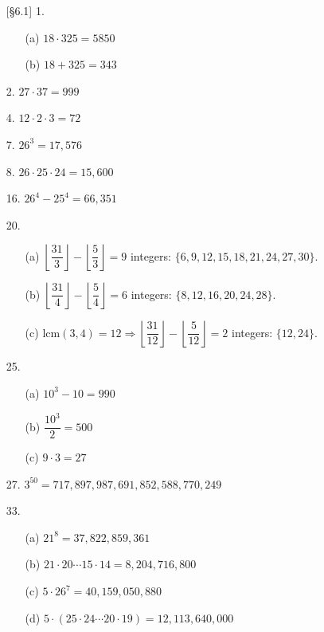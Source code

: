 \documentclass{article}
\begin{document}
\begin{enumerate}
    \item[{[\S 6.1]} 1.]
        \begin{itemize}
            \item[(a)] $18 \cdot 325 = 5850$
            \item[(b)] $18 + 325 = 343$
        \end{itemize}
    \item[2.] $27 \cdot 37 = 999$
    \item[4.] $12 \cdot 2 \cdot 3 = 72$
    \item[7.] $26^3 = 17,576$
    \item[8.] $26 \cdot 25 \cdot 24 = 15,600$
    \item[16.] $26^4 - 25^4 = 66,351$
    \item[20.]
        \begin{itemize}
            \item[(a)] $\left\lfloor\dfrac{31}{3}\right\rfloor - \left\lfloor\dfrac{5}{3}\right\rfloor = 9$ integers: $\{ 6, 9, 12, 15, 18, 21, 24, 27, 30 \}$.
            \item[(b)] $\left\lfloor\dfrac{31}{4}\right\rfloor - \left\lfloor\dfrac{5}{4}\right\rfloor = 6$ integers: $\{ 8, 12, 16, 20, 24, 28 \}$.
            \item[(c)] $\mathrm{lcm}(3,4) = 12 \Longrightarrow \left\lfloor\dfrac{31}{12}\right\rfloor - \left\lfloor\dfrac{5}{12}\right\rfloor = 2$ integers: $\{ 12, 24 \}$.
        \end{itemize}
    \item[25.]
        \begin{itemize}
            \item[(a)] $10^3 - 10 = 990$
            \item[(b)] $\dfrac{10^3}{2} = 500$
            \item[(c)] $9 \cdot 3 = 27$
        \end{itemize}
    \item[27.] $3^{50} = 717,897,987,691,852,588,770,249$
    \item[33.]
        \begin{itemize}
            \item[(a)] $21^8 = 37,822,859,361$
            \item[(b)] $21 \cdot 20 \cdots 15 \cdot 14 = 8,204,716,800$
            \item[(c)] $5 \cdot 26^7 = 40,159,050,880$
            \item[(d)] $5 \cdot (25 \cdot 24 \cdots 20 \cdot 19) = 12,113,640,000$

\end{itemize}
\end{enumerate}
\end{document}
